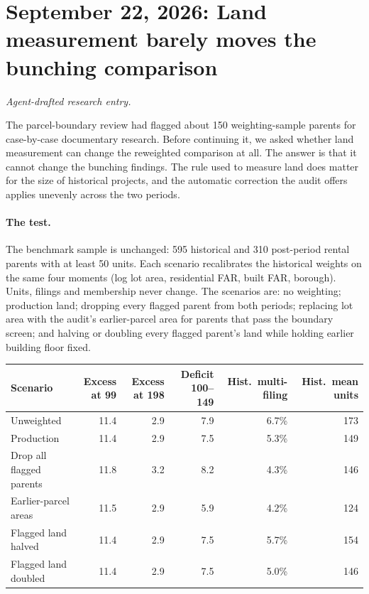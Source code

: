 \clearpage
\section*{September 22, 2026: Land measurement barely moves the bunching comparison}
\textit{Agent-drafted research entry.}

The parcel-boundary review had flagged about 150 weighting-sample parents for
case-by-case documentary research. Before continuing it, we asked whether land
measurement can change the reweighted comparison at all. The answer is that
it cannot change the bunching findings. The rule used to measure land does
matter for the size of historical projects, and the automatic correction the
audit offers applies unevenly across the two periods.

\paragraph{The test.} The benchmark sample is unchanged: 595
historical and 310 post-period rental parents with at least 50 units.
Each scenario recalibrates the historical weights on the same four moments
(log lot area, residential FAR, built FAR, borough). Units, filings and
membership never change. The scenarios are: no weighting; production land;
dropping every flagged parent from both periods; replacing lot area with the
audit's earlier-parcel area for parents that pass the boundary screen; and
halving or doubling every flagged parent's land while holding earlier
building floor fixed.

\begin{center}
\small
\begin{tabular}{lrrrrr}
\hline
Scenario & Excess at 99 & Excess at 198 & Deficit 100--149 & Hist.\ multi-filing & Hist.\ mean units \\
\hline
Unweighted & 11.4 & 2.9 & 7.9 & 6.7\% & 173 \\
Production & 11.4 & 2.9 & 7.5 & 5.3\% & 149 \\
Drop all flagged parents & 11.8 & 3.2 & 8.2 & 4.3\% & 146 \\
Earlier-parcel areas & 11.5 & 2.9 & 5.9 & 4.2\% & 124 \\
Flagged land halved & 11.4 & 2.9 & 7.5 & 5.7\% & 154 \\
Flagged land doubled & 11.4 & 2.9 & 7.5 & 5.0\% & 146 \\
\hline
\end{tabular}
\end{center}


